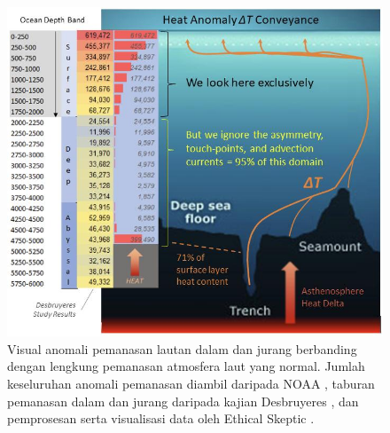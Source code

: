 \documentclass[10pt,twocolumn,letterpaper]{article}
\begin{document}
\begin{figure}[t]
\begin{center}
\includegraphics[width=1\textwidth]{deepsea.jpg}
\end{center}
   \caption{Visual anomali pemanasan lautan dalam dan jurang berbanding dengan lengkung pemanasan atmosfera laut yang normal. Jumlah keseluruhan anomali pemanasan diambil daripada NOAA \cite{147}, taburan pemanasan dalam dan jurang daripada kajian Desbruyeres \cite{132}, dan pemprosesan serta visualisasi data oleh Ethical Skeptic \cite{129}.}
\label{fig:21}
\end{figure}
\end{document}
